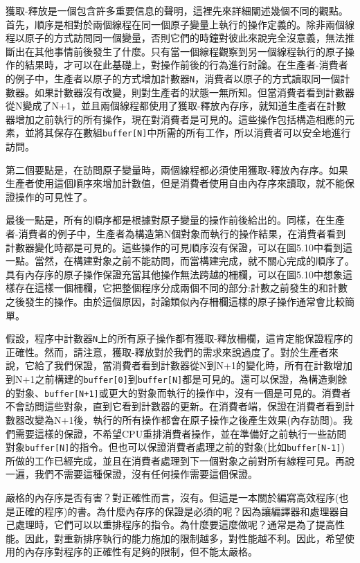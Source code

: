 獲取-釋放是一個包含許多重要信息的聲明，這裡先來詳細闡述幾個不同的觀點。首先，順序是相對於兩個線程在同一個原子變量上執行的操作定義的。除非兩個線程以原子的方式訪問同一個變量，否則它們的時鐘對彼此來說完全沒意義，無法推斷出在其他事情前後發生了什麼。只有當一個線程觀察到另一個線程執行的原子操作的結果時，才可以在此基礎上，對操作前後的行為進行討論。在生產者-消費者的例子中，生產者以原子的方式增加計數器\texttt{N}，消費者以原子的方式讀取同一個計數器。如果計數器沒有改變，則對生產者的狀態一無所知。但當消費者看到計數器從N變成了N+1，並且兩個線程都使用了獲取-釋放內存序，就知道生產者在計數器增加之前執行的所有操作，現在對消費者是可見的。這些操作包括構造相應的元素，並將其保存在數組\texttt{buffer[N]}中所需的所有工作，所以消費者可以安全地進行訪問。

第二個要點是，在訪問原子變量時，兩個線程都必須使用獲取-釋放內存序。如果生產者使用這個順序來增加計數值，但是消費者使用自由內存序來讀取，就不能保證操作的可見性了。

最後一點是，所有的順序都是根據對原子變量的操作前後給出的。同樣，在生產者-消費者的例子中，生產者為構造第N個對象而執行的操作結果，在消費者看到計數器變化時都是可見的。這些操作的可見順序沒有保證，可以在圖5.10中看到這一點。當然，在構建對象之前不能訪問，而當構建完成，就不關心完成的順序了。具有內存序的原子操作保證充當其他操作無法跨越的柵欄，可以在圖5.10中想象這樣存在這樣一個柵欄，它把整個程序分成兩個不同的部分:計數之前發生的和計數之後發生的操作。由於這個原因，討論類似內存柵欄這樣的原子操作通常會比較簡單。

假設，程序中計數器\texttt{N}上的所有原子操作都有獲取-釋放柵欄，這肯定能保證程序的正確性。然而，請注意，獲取-釋放對於我們的需求來說過度了。對於生產者來說，它給了我們保證，當消費者看到計數器從N到N+1的變化時，所有在計數增加到N+1之前構建的\texttt{buffer[0]}到\texttt{buffer[N]}都是可見的。還可以保證，為構造剩餘的對象、\texttt{buffer[N+1]}或更大的對象而執行的操作中，沒有一個是可見的。消費者不會訪問這些對象，直到它看到計數器的更新。在消費者端，保證在消費者看到計數器改變為N+1後，執行的所有操作都會在原子操作之後產生效果(內存訪問)。我們需要這樣的保證，不希望CPU重排消費者操作，並在準備好之前執行一些訪問對象\texttt{buffer[N]}的指令。但也可以保證消費者處理之前的對象(比如\texttt{buffer[N-1]})所做的工作已經完成，並且在消費者處理到下一個對象之前對所有線程可見。再說一遍，我們不需要這種保證，沒有任何操作需要這個保證。

嚴格的內存序是否有害？對正確性而言，沒有。但這是一本關於編寫高效程序(也是正確的程序)的書。為什麼內存序的保證是必須的呢？因為讓編譯器和處理器自己處理時，它們可以以重排程序的指令。為什麼要這麼做呢？通常是為了提高性能。因此，對重新排序執行的能力施加的限制越多，對性能越不利。因此，希望使用的內存序對程序的正確性有足夠的限制，但不能太嚴格。

